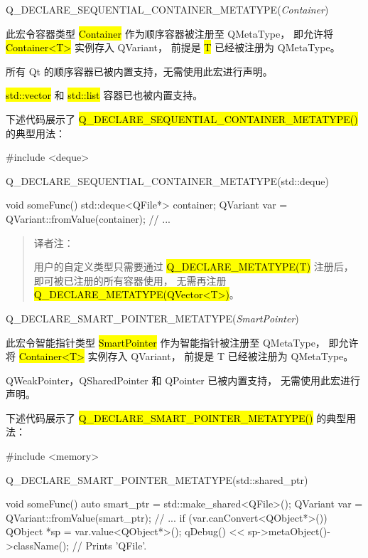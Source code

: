 Q\_DECLARE\_SEQUENTIAL\_CONTAINER\_METATYPE(\emph{Container})

此宏令容器类型 \hl{Container} 作为顺序容器被注册至 QMetaType，
即允许将 \hl{Container<T>} 实例存入 QVariant，
前提是 \hl{T} 已经被注册为 QMetaType。

\begin{notice}
所有 Qt 的顺序容器已被内置支持，无需使用此宏进行声明。
\end{notice}

\hl{std::vector} 和 \hl{std::list} 容器已也被内置支持。

下述代码展示了 \hl{Q\_DECLARE\_SEQUENTIAL\_CONTAINER\_METATYPE()} 的典型用法：

\begin{cppcode}
#include <deque>

Q_DECLARE_SEQUENTIAL_CONTAINER_METATYPE(std::deque)

void someFunc()
{
    std::deque<QFile*> container;
    QVariant var = QVariant::fromValue(container);
    // ...
}
\end{cppcode}

\begin{quote}
译者注：

用户的自定义类型只需要通过 \hl{Q\_DECLARE\_METATYPE(T)} 注册后，
即可被已注册的所有容器使用，
无需再注册 \hl{Q\_DECLARE\_METATYPE(QVector<T>)}。
\end{quote}

Q\_DECLARE\_SMART\_POINTER\_METATYPE(\emph{SmartPointer})

此宏令智能指针类型 \hl{SmartPointer} 作为智能指针被注册至 QMetaType，
即允许将 \hl{Container<T>} 实例存入 QVariant，
前提是 T 已经被注册为 QMetaType。

\begin{notice}
QWeakPointer，QSharedPointer 和 QPointer 已被内置支持，
无需使用此宏进行声明。
\end{notice}

下述代码展示了 \hl{Q\_DECLARE\_SMART\_POINTER\_METATYPE()} 的典型用法：

\begin{cppcode}
#include <memory>

Q_DECLARE_SMART_POINTER_METATYPE(std::shared_ptr)

void someFunc()
{
    auto smart_ptr = std::make_shared<QFile>();
    QVariant var = QVariant::fromValue(smart_ptr);
    // ...
    if (var.canConvert<QObject*>()) {
        QObject *sp = var.value<QObject*>();
        qDebug() << sp->metaObject()->className(); // Prints 'QFile'.
    }
}
\end{cppcode}

